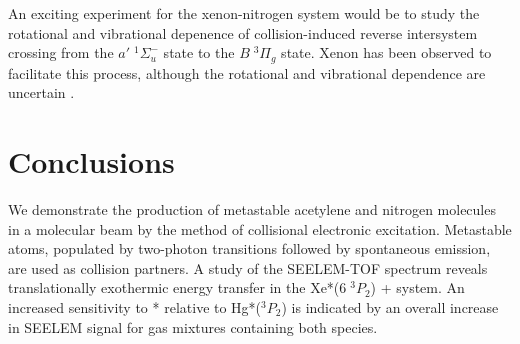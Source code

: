 \documentclass[12pt]{mitthesis}
\begin{document}
An exciting experiment for the xenon-nitrogen system would be to study
the rotational and vibrational depenence of collision-induced reverse
intersystem crossing from the $a' \; ^1\Sigma_u^-$ state to the $B \;
^3\Pi_g$ state.  Xenon has been observed to facilitate this process,
although the rotational and vibrational dependence are uncertain
\cite{umemoto03a}.

\section{Conclusions}

We demonstrate the production of metastable acetylene and nitrogen
molecules in a molecular beam by the method of collisional electronic
excitation.  Metastable atoms, populated by two-photon transitions
followed by spontaneous emission, are used as collision partners.  A
study of the SEELEM-TOF spectrum reveals translationally exothermic
energy transfer in the Xe*($6 \; ^3P_2$) +  system.  An
increased sensitivity to * relative to Hg*($^3P_2$) is
indicated by an overall increase in SEELEM signal for gas mixtures
containing both species.


 

\end{document}

